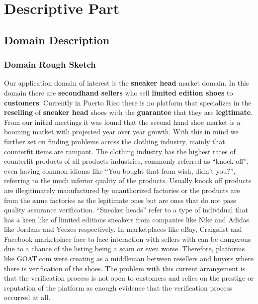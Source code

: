 \chapter{Descriptive Part}
\newpage
\section{Domain Description}
\subsection{Domain Rough Sketch}
Our application domain of interest is the \textbf{sneaker head} market domain. In this domain there are \textbf{secondhand sellers} who sell \textbf{limited edition shoes} to \textbf{customers}. Currently in Puerto Rico there is no platform that specializes in the \textbf{reselling} of \textbf{sneaker head} shoes with the \textbf{guarantee} that they are \textbf{legitimate}. From our initial meetings it was found that the second hand shoe market is a booming market with projected year over year growth. With this in mind we further set on finding problems across the clothing industry, mainly that counterfit items are rampant. The clothing industry has the highest rates of counterfit products of all products industries, commonly referred as ``knock off'', even having common idioms like ``You bought that from wish, didn't you?'', referring to the much inferior quality of the products. Usually knock off products are illegitimately manufactured by unauthorized factories or the products are from the same factories as the legitimate ones but are ones that do not pass quality assurance verification. ``Sneaker heads'' refer to a type of individual that has a keen like of limited editions sneakers from companies like Nike and Adidas like Jordans and Yeezes respectively.  In marketplaces like eBay, Craigslist and Facebook marketplace face to face interaction with sellers with can be dangerous due to a chance of the listing being a scam or even worse. Therefore, platforms like GOAT.com were creating as a middleman between resellers and buyers where there is verification of the shoes. The problem with this current arrangement is that the verification process is not open to customers and relies on the prestige or reputation of the platform as enough evidence that the verification process occurred at all.
